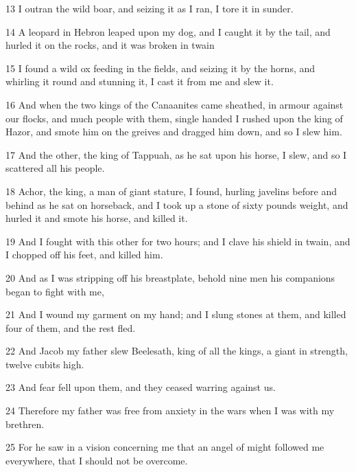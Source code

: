 \par 13 I outran the wild boar, and seizing it as I ran, I tore it in sunder.

\par 14 A leopard in Hebron leaped upon my dog, and I caught it by the tail, and hurled it on the rocks, and it was broken in twain

\par 15 I found a wild ox feeding in the fields, and seizing it by the horns, and whirling it round and stunning it, I cast it from me and slew it.

\par 16 And when the two kings of the Canaanites came sheathed, in armour against our flocks, and much people with them, single handed I rushed upon the king of Hazor, and smote him on the greives and dragged him down, and so I slew him.

\par 17 And the other, the king of Tappuah, as he sat upon his horse, I slew, and so I scattered all his people.

\par 18 Achor, the king, a man of giant stature, I found, hurling javelins before and behind as he sat on horseback, and I took up a stone of sixty pounds weight, and hurled it and smote his horse, and killed it.

\par 19 And I fought with this other for two hours; and I clave his shield in twain, and I chopped off his feet, and killed him.

\par 20 And as I was stripping off his breastplate, behold nine men his companions began to fight with me,

\par 21 And I wound my garment on my hand; and I slung stones at them, and killed four of them, and the rest fled.

\par 22 And Jacob my father slew Beelesath, king of all the kings, a giant in strength, twelve cubits high.

\par 23 And fear fell upon them, and they ceased warring against us.

\par 24 Therefore my father was free from anxiety in the wars when I was with my brethren.

\par 25 For he saw in a vision concerning me that an angel of might followed me everywhere, that I should not be overcome.

